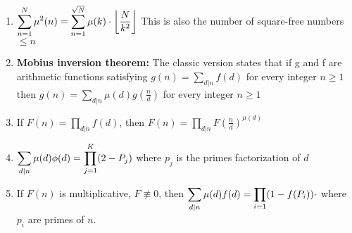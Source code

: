 \begin{enumerate}
            \item $\displaystyle \displaystyle \sum\limits_{n=1}^N {\mu}^2(n) = \displaystyle \sum\limits_{n=1}^{\sqrt{N}}
                \mu(k)
                \cdot \left \lfloor \dfrac{N}{k^2} \right\rfloor$
                This is also the number of square-free numbers $\displaystyle \le n$
            \item \textbf{Mobius inversion theorem:} The classic version states that if g and f are arithmetic
                functions
                satisfying
                $g(n) = \displaystyle \sum_{d|n}f(d) $ for every integer $n \ge 1$ then $g(n) = \displaystyle
                \sum_{d|n}\mu(d)g\left(\frac{n}{d}\right)$ for every integer $n \ge 1$
            \item If $\displaystyle F(n) = \displaystyle \prod_{d|n} f(d)$, then $\displaystyle F(n) = \displaystyle
                \prod_{d|n}
                F\left(\frac{n}{d}\right)^{\mu(d)}$
            \item $\displaystyle \displaystyle \sum_{d|n}\mu(d)\phi(d) = \displaystyle \prod_{j=1}^K (2 - P_j)$
                where $\displaystyle p_j$ is the primes factorization of $d$
            \item 
                If $\displaystyle F(n)$ is multiplicative, $\displaystyle F \not\equiv 0$, then $\displaystyle
                    \displaystyle
                    \sum_{d|n} \mu(d) f(d) = \displaystyle \prod_{i=1} (1 - f(P_i)) \cdot$
                    where $\displaystyle p_i$ are primes of $n$.

                \end{enumerate}
